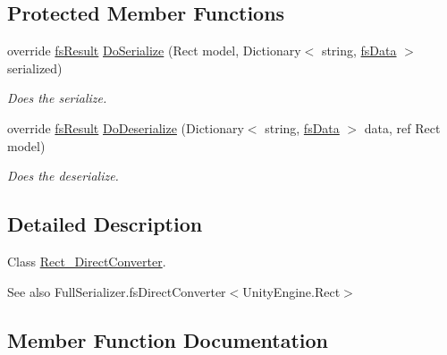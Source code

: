 \subsection*{Protected Member Functions}
\begin{DoxyCompactItemize}
\item 
override \hyperlink{struct_full_serializer_1_1fs_result}{fs\+Result} \hyperlink{class_full_serializer_1_1_internal_1_1_direct_converters_1_1_rect___direct_converter_a23a39057a3eca893d06cb2808b3c7747}{Do\+Serialize} (Rect model, Dictionary$<$ string, \hyperlink{class_full_serializer_1_1fs_data}{fs\+Data} $>$ serialized)
\begin{DoxyCompactList}\small\item\em Does the serialize. \end{DoxyCompactList}\item 
override \hyperlink{struct_full_serializer_1_1fs_result}{fs\+Result} \hyperlink{class_full_serializer_1_1_internal_1_1_direct_converters_1_1_rect___direct_converter_a91f4f7c64ff15f6ff136e59cc9192263}{Do\+Deserialize} (Dictionary$<$ string, \hyperlink{class_full_serializer_1_1fs_data}{fs\+Data} $>$ data, ref Rect model)
\begin{DoxyCompactList}\small\item\em Does the deserialize. \end{DoxyCompactList}\end{DoxyCompactItemize}


\subsection{Detailed Description}
Class \hyperlink{class_full_serializer_1_1_internal_1_1_direct_converters_1_1_rect___direct_converter}{Rect\+\_\+\+Direct\+Converter}. 

\begin{DoxySeeAlso}{See also}
Full\+Serializer.\+fs\+Direct\+Converter$<$\+Unity\+Engine.\+Rect$>$


\end{DoxySeeAlso}


\subsection{Member Function Documentation}
\mbox{\label{class_full_serializer_1_1_internal_1_1_direct_converters_1_1_rect___direct_converter_ae48648354077452a90727bbaa8915172}} 
